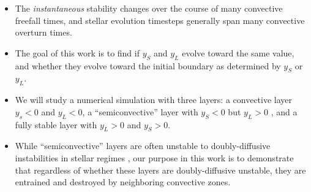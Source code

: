 \begin{itemize}
\item The \emph{instantaneous} stability changes over the course of many convective freefall times, and stellar evolution timesteps generally span many convective overturn times.
\item The goal of this work is to find if $y_S$ and $y_L$ evolve toward the same value, and whether they evolve toward the initial boundary as determined by $y_S$ or $y_L$.
\item We will study a numerical simulation with three layers: a convective layer $y_s < 0$ and $y_L < 0$, a ``semiconvective'' \citep[see section 4 of][]{mesa2} \citep{salaris_cassisi_2017} layer with $y_S < 0$ but $y_L > 0$ \citep[which is stable to ODDC][]{garaud_2018}, and a fully stable layer with $y_L > 0$ and $y_S > 0$.
\item While ``semiconvective'' layers are often unstable to doubly-diffusive instabilities in stellar regimes \citep{moore_garaud_2016}, our purpose in this work is to demonstrate that regardless of whether these layers are doubly-diffusive unstable, they are entrained and destroyed by neighboring convective zones.
\end{itemize}

